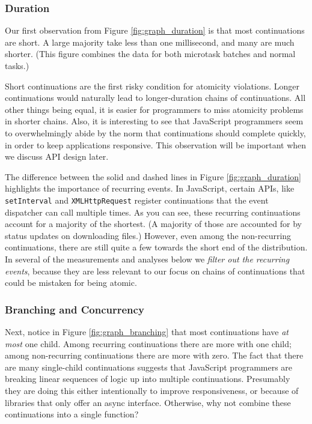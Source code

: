 \documentclass[acmsmall,anonymous,review]{acmart}\settopmatter{printfolios=true,printccs=false,printacmref=false}
\begin{document}
\subsubsection{Duration}

Our first observation from Figure \ref{fig:graph_duration} is that most continuations are short.
A large majority take less than one millisecond, and many are much shorter.
(This figure combines the data for both microtask batches and normal tasks.)

Short continuations are the first risky condition for atomicity violations.
Longer continuations would naturally lead to longer-duration chains of continuations.
All other things being equal, it is easier for programmers to miss atomicity problems in shorter chains.
Also, it is interesting to see that JavaScript programmers seem to overwhelmingly abide by the norm that continuations should complete quickly, in order to keep applications responsive.
This observation will be important when we discuss API design later.

The difference between the solid and dashed lines in Figure \ref{fig:graph_duration} highlights the importance of recurring events.
In JavaScript, certain APIs, like \texttt{setInterval} and \texttt{XMLHttpRequest} register continuations that the event dispatcher can call multiple times.
As you can see, these recurring continuations account for a majority of the shortest.
(A majority of those are accounted for by status updates on downloading files.)
However, even among the non-recurring continuations, there are still quite a few towards the short end of the distribution.
In several of the measurements and analyses below we \emph{filter out the recurring events}, because they are less relevant to our focus on chains of continuations that could be mistaken for being atomic.

\subsubsection{Branching and Concurrency}

Next, notice in Figure \ref{fig:graph_branching} that most continuations have \emph{at most} one child.
Among recurring continuations there are more with one child; among non-recurring continuations there are more with zero.
The fact that there are many single-child continuations suggests that JavaScript programmers are breaking linear sequences of logic up into multiple continuations.
Presumably they are doing this either intentionally to improve responsiveness, or because of libraries that only offer an async interface.
Otherwise, why not combine these continuations into a single function?
\end{document}
